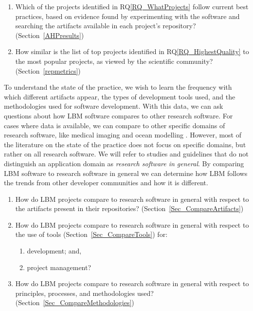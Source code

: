 \documentclass[final, 3p, times, authoryear]{elsarticle}
\newcounter{rqnum} %
\newcommand{\rqref}[1]{RQ\ref{#1}}
\begin{document}
\begin{enumerate}
	\item [RQ\refstepcounter{rqnum}\therqnum \label{RQ_HighestQuality}:] Which
	of the projects identified in \rqref{RQ_WhatProjects} follow current best
	practices, based on evidence found by experimenting with the software and
	searching the artifacts available in each project's repository?
	(Section~\ref{AHPresults})
	\item [RQ\refstepcounter{rqnum}\therqnum \label{RQ_CompareHQ2Popular}:] How
	similar is the list of top projects identified in \rqref{RQ_HighestQuality}
	to the most popular projects, as viewed by the scientific community?
	(Section~\ref{repmetrics})
\end{enumerate}

To understand the state of the practice, we wish to learn the frequency with
which different artifacts appear, the types of development tools used, and the
methodologies used for software development.  With this data, we can ask
questions about how LBM software compares to other research software.  For cases
where data is available, we can compare to other specific domains of research
software, like medical imaging \citep{Dong2021} and ocean modelling
\citep{JungEtAl2022}.  However, most of the literature on the state of the
practice does not focus on specific domains, but rather on all research software.
We will refer to studies and guidelines that do
not distinguish an application domain as \emph{research software in general}. By
comparing LBM software to research software in general we can determine how LBM
follows the trends from other developer communities and how it is different.

\begin{enumerate}
    \item [RQ\refstepcounter{rqnum}\therqnum \label{RQ_CompareArtifacts}:] How
	do LBM projects compare to research software in general with respect to the
	artifacts present in their repositories?
	(Section~\ref{Sec_CompareArtifacts})
	\item [RQ\refstepcounter{rqnum}\therqnum \label{RQ_CompareToolsProjMngmnt}:]
	How do LBM projects compare to research software in general with respect to
	the use of tools (Section~\ref{Sec_CompareTools}) for:
	\begin{enumerate} 
		\item [\rqref{RQ_CompareToolsProjMngmnt}.a] development; and,
		\item [\rqref{RQ_CompareToolsProjMngmnt}.b] project management?
	\end{enumerate}
	\item [RQ\refstepcounter{rqnum}\therqnum \label{RQ_CompareMethodologies}:]
	How do LBM projects compare to research software in general with respect to
	principles, processes, and methodologies used?
	(Section~\ref{Sec_CompareMethodologies})
\end{enumerate}	
\end{document}
